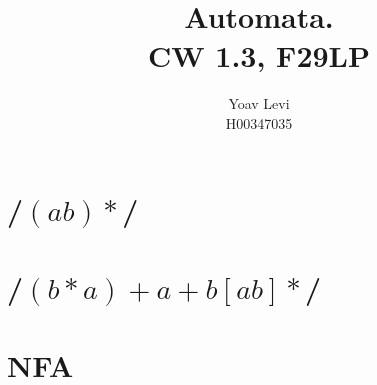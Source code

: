 \documentclass{article} %
\title{%
  Automata. \\
  \large CW 1.3, F29LP}
\author{%
Yoav Levi\\
\small H00347035
} %
\date{}
\begin{document}
    \maketitle %
    \newpage

    \section{/$(ab)*$/} %
    \section{/$(b*a)+a+b[ab]*$/}
    \section{NFA}
\end{document}
